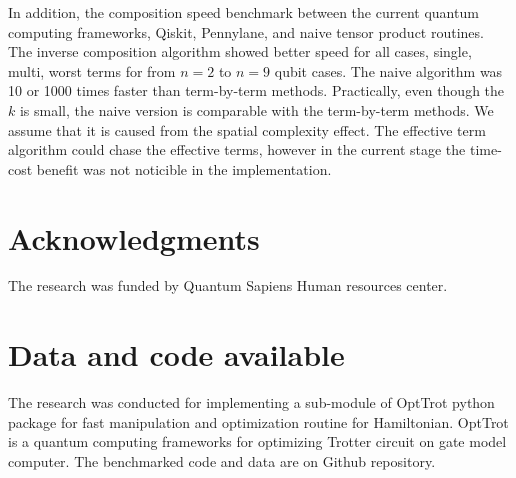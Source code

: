 \documentclass[twocolumn]{article}
\begin{document}
In addition, the composition speed benchmark between the current quantum computing frameworks, Qiskit, Pennylane, and naive
tensor product routines. 
The inverse composition algorithm showed better speed for all cases, single, multi, worst terms 
for from $n=2$ to $n=9$ qubit cases. 
The naive algorithm was 10 or 1000 times faster than term-by-term methods.
Practically, even though the $k$ is small, the naive version is comparable 
with the term-by-term methods. 
We assume that it is caused from the spatial complexity effect.
The effective term algorithm could chase the effective terms, however in the current stage the time-cost benefit 
was not noticible in the implementation.

\section*{Acknowledgments}
The research was funded by Quantum Sapiens Human resources center.

\section*{Data and code available}
The research was conducted for implementing a sub-module of OptTrot python package for 
fast manipulation and optimization routine for Hamiltonian.
OptTrot is a quantum computing frameworks for optimizing Trotter circuit on gate model computer.
The benchmarked code and data are on Github repository\cite{kim_2024}.
  
  

\appendix
%
%
%
%
%
\end{document}
